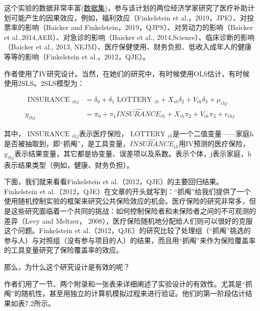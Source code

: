 \documentclass[cn,12pt,math=newtx,citestyle=gb7714-2015,bibstyle=gb7714-2015]{elegantbook}
\begin{document}
	这个实验的数据非常丰富(\href{https://www.nber.org/research/data/oregon-health-insurance-experiment-data}{数据集})，参与该计划的两位经济学家研究了医疗补助计划可能产生的因果效应，例如，福利效应（Finkelstein et al.，2019，JPE）、对投票率的影响（Baicker and Finkelstein，2019，QJPS）、对劳动力的影响（Baicker et al.,2014,AER）、对急诊的影响（Baicker et al., 2014,Science）、临床诊断的影响（Baicker et al., 2013, NEJM）、医疗保健使用、财务负担、低收入成年人的健康等等的影响（Finkelstein et al.，2012，QJE）。
	
	作者使用了IV研究设计。当然，在她们的研究中，有时候使用OLS估计，有时候使用2SLS。2SLS模型为：
	
	\begin{equation}
		\begin{aligned}
			\text { INSURANCE }_{i h j} &=\delta_{0}+\delta_{1} \text { LOTTERY }_{i h}+X_{i h} \delta_{2}+V_{i h} \delta_{3}+\mu_{i h j} \\
			y_{i h j} &=\pi_{0}+\pi_{1} \hat{INSURANCE}_{i h}+X_{i h} \pi_{2}+V_{i h} \pi_{3}+v_{i h j}
		\end{aligned}
	\end{equation}
	
	其中，$\text { INSURANCE }_{i h j}$表示医疗保险，$\text { LOTTERY }_{i h}$是一个二值变量——家庭h是否被抽取到，即“抓阄”，是工具变量，$\hat{INSURANCE}_{i h}$用IV预测的医疗保险，$y_{i h j}$表示结果变量，其它都是协变量、误差项以及系数。表示个体，j表示家庭，h表示结果类型（例如，健康、财务负担）。
	
	下面，我们就来看看Finkelstein et al.（2012，QJE）的主要回归结果。Finkelstein et al.（2012，QJE）在文章的开头就写到：“抓阄”给我们提供了一个使用随机控制实验的框架来研究公共保险效应的机会。医疗保险的研究非常多，但是这些研究面临着一个共同的挑战：如何控制保险者和未保险者之间的不可观测的差异（Levy and Meltzer， 2008），医疗保险随机地分配给人们则可以很好的克服这个问题。Finkelstein et al.（2012，QJE）的研究比较了处理组（“抓阄”挑选的参与人）与对照组（没有参与项目的人）的结果，而且用“抓阄”来作为保险覆盖率的工具变量研究了保险覆盖率的效应。
	
	那么，为什么这个研究设计是有效的呢？
	
	作者们用了一节、两个附录和一张表来详细阐述了实验设计的有效性。尤其是“抓阄”的随机性，甚至用独立的计算机模拟过程来进行验证。他们的第一阶段估计结果如表7.2所示。
	
\end{document}
